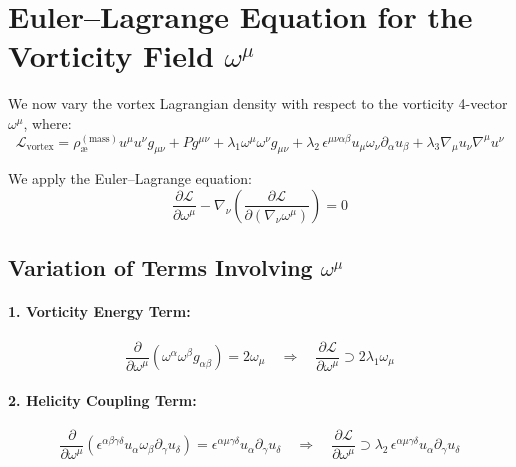 \documentclass[twocolumn,aps,pre,floatfix,nofootinbib]{revtex4-2}
\begin{document}
    \section*{Euler--Lagrange Equation for the Vorticity Field \( \omega^\mu \)}

    We now vary the vortex Lagrangian density with respect to the vorticity 4-vector \( \omega^\mu \), where:
    \begin{equation}
        \mathcal{L}_{\text{vortex}} =
        \rho_{\text{\ae}}^{(\text{mass})} u^\mu u^\nu g_{\mu\nu}
        + P g^{\mu\nu}
        + \lambda_1 \omega^\mu \omega^\nu g_{\mu\nu}
        + \lambda_2\, \epsilon^{\mu\nu\alpha\beta} u_\mu \omega_\nu \partial_\alpha u_\beta
        + \lambda_3 \nabla_\mu u_\nu \nabla^\mu u^\nu
    \end{equation}

    We apply the Euler–Lagrange equation:
    \begin{equation}
        \frac{\partial \mathcal{L}}{\partial \omega^\mu}
        - \nabla_\nu \left( \frac{\partial \mathcal{L}}{\partial (\nabla_\nu \omega^\mu)} \right) = 0
    \end{equation}

    \subsection*{Variation of Terms Involving \( \omega^\mu \)}

    \paragraph{1. Vorticity Energy Term:}
    \[
        \frac{\partial}{\partial \omega^\mu} \left( \omega^\alpha \omega^\beta g_{\alpha\beta} \right)
        = 2 \omega_\mu
        \quad \Rightarrow \quad
        \frac{\partial \mathcal{L}}{\partial \omega^\mu} \supset 2 \lambda_1 \omega_\mu
    \]

    \paragraph{2. Helicity Coupling Term:}
    \[
        \frac{\partial}{\partial \omega^\mu} \left( \epsilon^{\alpha\beta\gamma\delta} u_\alpha \omega_\beta \partial_\gamma u_\delta \right)
        = \epsilon^{\alpha\mu\gamma\delta} u_\alpha \partial_\gamma u_\delta
        \quad \Rightarrow \quad
        \frac{\partial \mathcal{L}}{\partial \omega^\mu} \supset \lambda_2\, \epsilon^{\alpha\mu\gamma\delta} u_\alpha \partial_\gamma u_\delta
    \]
\end{document}
